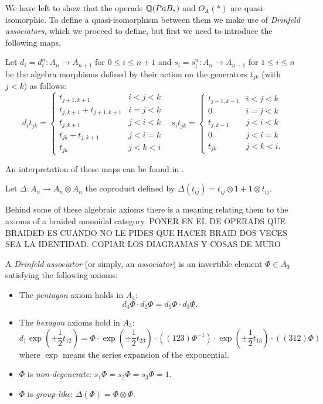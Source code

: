 \documentclass[TFM.tex]{subfiles}
\begin{document}
We have left to show that the operads $\mathbb{Q}(PaB_*)$ and $O_A(*)$ are quasi-isomorphic. To define a quasi-isomorphism between them we make use of \emph{Drinfeld associators}, which we proceed to define, but first we need to introduce the following maps.

\begin{defi}
Let $d_i = d^n_i : A_n → A_{n+1}$ for $0 ≤ i ≤ n + 1$ and $s_i = s^n_i : A_n → A_{n−1}$
for $1 ≤ i ≤ n$ be the algebra morphisms defined by their action on the generators $t_{jk}$ (with
$j < k$) as follows:
\[
d_it_{jk} =\begin{cases}
t_{j+1,k+1} & i < j < k\\
t_{j,k+1} + t_{j+1,k+1} & i = j < k\\
t_{j,k+1} & j < i < k\\
t_{jk} + t_{j,k+1} & j < i = k\\
t_{jk} & j < k < i
\end{cases}\ \ \ \
s_it_{jk} =\begin{cases}
t_{j−1,k−1} & i < j < k\\
0 & i = j < k\\
t_{j,k−1} & j < i < k\\
0 & j < i = k\\
t_{jk} & j < k < i.
\end{cases}
\]


\end{defi}
An interpretation of these maps can be found in \cite{1deTamarkin}. 

\begin{defi}
Let $\Delta:A_n\to A_n\otimes A_n$ the coproduct defined by $\Delta(t_{ij})=t_{ij}\otimes 1+1\otimes t_{ij}$. 
\end{defi}

\begin{defi}
	
	Behind some of these algebraic axioms there is a meaning relating them to the axioms of a braided monoidal category. PONER EN EL DE OPERADS QUE BRAIDED ES CUANDO NO LE PIDES QUE HACER BRAID DOS VECES SEA LA IDENTIDAD. COPIAR LOS DIAGRAMAS Y COSAS  DE MURO
	
	
A \emph{Drinfeld associator} (or simply, an \emph{associator}) is an invertible element $\Phi\in A_3$ satisfying the following
axioms:
\begin{itemize}
\item The \emph{pentagon} axiom holds in $A_4$:
\[
d_4\Phi\cdot d_2\Phi=d_1\Phi\cdot d_3\Phi.
\]
\item The \emph{hexagon} axioms hold in $A_3$:
\[
d_1\exp\left(\pm\frac{1}{2}t_{12}\right)=\Phi\cdot\exp\left(\pm\frac{1}{2}t_{23}\right)\cdot ((123)\Phi^{-1})\cdot\exp\left(\pm\frac{1}{2}t_{13}\right)\cdot((312)\Phi)
\]
where $\exp$ means the series expansion of the exponential. 
\item $\Phi$ is \emph{non-degenerate}: $s_1\Phi=s_2\Phi=s_3\Phi=1$.
\item $\Phi$ is \emph{group-like}: $\Delta(\Phi)=\Phi\otimes\Phi$. %
\end{itemize}
\end{defi}
\end{document}
